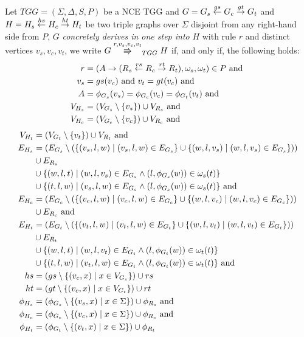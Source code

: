 \begin{definition}
	\label{def:tgg_dstep}
	Let $TGG = (\Sigma, \Delta, S, P)$ be a NCE TGG and $G = G_s \overset{gs}{\leftarrow} G_c \overset{gt}{\rightarrow} G_t$ and $H = H_s \overset{hs}{\leftarrow} H_c \overset{ht}{\rightarrow} H_t$ be two triple graphs over $\Sigma$ disjoint from any right-hand side from $P$, $G$ \emph{concretely derives in one step into} $H$ with rule $r$ and distinct vertices $v_s, v_c, v_t$, we write $G \tcderiv{r}{v_s,v_c,v_t}{TGG} H$ if, and only if, the following holds:
	\begin{align*}
		r & = (A \to (R_s \overset{rs}{\leftarrow} R_c \overset{rt}{\rightarrow} R_t), \omega_s, \omega_t) \in P \text{ and } \\
		v_s & = gs(v_c) \text{ and } v_t = gt(v_c) \text{ and}\\
		A & = \phi_{G_s}(v_s) = \phi_{G_c}(v_c) = \phi_{G_t}(v_t) \text{ and} \\
		V_{H_s}  & = (V_{G_s} \setminus \{v_s\}) \cup V_{R_s} \text{ and}\\
		V_{H_c}  & = (V_{G_c} \setminus \{v_c\}) \cup V_{R_c} \text{ and}
	\end{align*}
	\begin{align*}
		V_{H_t}  & = (V_{G_t} \setminus \{v_t\}) \cup V_{R_t} \text{ and}\\
		E_{H_s} & = (E_{G_s} \setminus (\{(v_s,l,w) \; | \; (v_s,l,w) \in E_{G_s}\} \cup \{(w,l,v_s) \; | \; (w,l,v_s) \in E_{G_s}\})) \\
		& \cup E_{R_s} \\
		& \cup \{(w,l,t) \; | \; (w,l,v_s) \in E_{G_s} \land (l,\phi_{G_s}(w)) \in \omega_{s}(t)\} \\
		& \cup \{(t,l,w) \; | \; (v_s,l,w) \in E_{G_s} \land (l,\phi_{G_s}(w)) \in \omega_{s}(t)\} \text{ and} \\
		E_{H_c} & = (E_{G_c} \setminus (\{(v_c,l,w) \; | \; (v_c,l,w) \in E_{G_c}\} \cup \{(w,l,v_c) \; | \; (w,l,v_c) \in E_{G_c}\})) \\
		& \cup E_{R_c} \text{ and} \\
		E_{H_t} & = (E_{G_t} \setminus (\{(v_t,l,w) \; | \; (v_t,l,w) \in E_{G_t}\} \cup \{(w,l,v_t) \; | \; (w,l,v_t) \in E_{G_t}\})) \\
		& \cup E_{R_t} \\
		& \cup \{(w,l,t) \; | \; (w,l,v_t) \in E_{G_t} \land (l,\phi_{G_t}(w)) \in \omega_{t}(t)\} \\
		& \cup \{(t,l,w) \; | \; (v_t,l,w) \in E_{G_t} \land (l,\phi_{G_t}(w)) \in \omega_{t}(t)\} \text{ and} \\
		hs		& = (gs \setminus \{(v_c,x) \; | \; x \in V_{G_s}\}) \cup rs  \\
		ht		& = (gt \setminus \{(v_c,x) \; | \; x \in V_{G_t}\}) \cup rt  \\
		\phi_{H_s} & = (\phi_{G_s} \setminus \{(v_s,x) \; | \; x \in \Sigma\}) \cup \phi_{R_s} \text{ and}\\
		\phi_{H_c} & = (\phi_{G_c} \setminus \{(v_c,x) \; | \; x \in \Sigma\}) \cup \phi_{R_c} \text{ and}\\
		\phi_{H_t} & = (\phi_{G_t} \setminus \{(v_t,x) \; | \; x \in \Sigma\}) \cup \phi_{R_t}\\
	\end{align*}
\end{definition}

